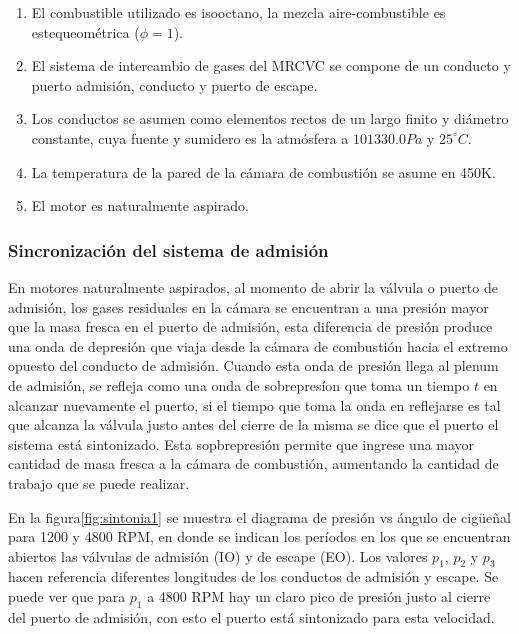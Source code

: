\begin{enumerate}
    \item El combustible utilizado es isooctano, la mezcla aire-combustible es
        estequeométrica ($\phi=1$).
    \item El sistema de intercambio de gases del MRCVC se compone de un
        conducto y puerto admisión, conducto y puerto de escape.
    \item Los conductos se asumen como elementos rectos de un largo finito y
        diámetro constante, cuya fuente y sumidero es la atmósfera a $101330.0
        Pa$ y $25^{\circ}C$.
    \item La temperatura de la pared de la cámara de combustión se asume en
        450K.
    \item El motor es naturalmente aspirado.
\end{enumerate}


\subsubsection{Sincronización del sistema de admisión}
%
%
En motores naturalmente aspirados, al momento de abrir la válvula o puerto de
admisión, los gases residuales en la cámara se encuentran a una presión mayor
que la masa fresca en el puerto de admisión, esta diferencia de presión produce
una onda de depresión que viaja desde la cámara de combustión hacia el extremo
opuesto del conducto de admisión.
%
Cuando esta onda de presión llega al plenum de admisión, se refleja como una
onda de sobrepresíon que toma un tiempo $t$ en alcanzar nuevamente el puerto,
si el tiempo que toma la onda en reflejarse es tal que alcanza la válvula justo
antes del cierre de la misma se dice que el puerto el sistema está sintonizado.
%
Esta sopbrepresión permite que ingrese una mayor cantidad de masa fresca a la
cámara de combustión, aumentando la cantidad de trabajo que se puede realizar.

En la figura\ref{fig:sintonia1} se muestra el diagrama de presión vs ángulo de
cigüeñal para 1200 y 4800 RPM, en donde se indican los períodos en los que se
encuentran abiertos las válvulas de admisión (IO) y de escape (EO).
%
Los valores $p_1$, $p_2$ y $p_3$ hacen referencia diferentes longitudes de los
conductos de admisión y escape.
%
Se puede ver que para $p_1$ a 4800 RPM hay un claro pico de presión justo al
cierre del puerto de admisión, con esto el puerto está sintonizado para esta
velocidad.

